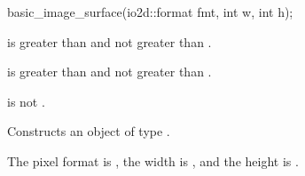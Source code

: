 %
\begin{itemdecl}
basic_image_surface(io2d::format fmt, int w, int h);
\end{itemdecl}
\begin{itemdescr}
\pnum
\requires
{} is greater than  and not greater than .

\pnum
{} is greater than  and not greater than .

\pnum
{} is not .

\pnum
\effects
Constructs an object of type .

\pnum
The pixel format is , the width is , and the height is .
\end{itemdescr}

